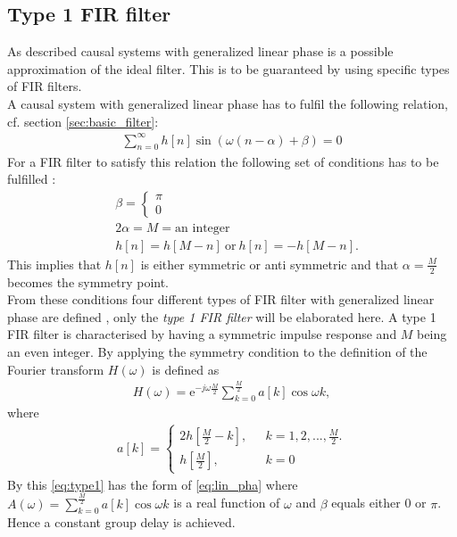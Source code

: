 \subsection{Type 1 FIR filter}
As described causal systems with generalized linear phase is a possible approximation of the ideal filter. This is to be guaranteed by using specific types of FIR filters.\\
A causal system with generalized linear phase has to fulfil the following relation, cf. section \ref{sec:basic_filter}:
\begin{align}
\sum_{n=0}^{\infty}h[n]\sin\left(\omega \left(n-\alpha \right) + \beta \right) = 0
\end{align}
For a FIR filter to satisfy this relation the following set of conditions has to be fulfilled \cite{DTSP, p.342}:
\begin{align} \label{eq:FIR_con}
&\beta = \left\{ \begin{matrix} 
\pi  \\
0 
\end{matrix}\right. \nonumber  \\ 
&2\alpha = M = \text{an integer} \\ 
&h[n]=h[M-n] \ \text{or} \ h[n]=-h[M-n]. \nonumber  
\end{align} 
This implies that $h[n]$ is either symmetric or anti symmetric and that $\alpha = \frac{M}{2}$ becomes the symmetry point. \\
From these conditions four different types of FIR filter with generalized linear phase are defined \cite{DTSP, page 343}, only the \textit{type 1 FIR filter} will be elaborated here.
A type 1 FIR filter is characterised by having a symmetric impulse response and $M$ being an even integer. By applying the symmetry condition to the definition of the Fourier transform $H(\omega)$ is defined as \cite{page 343,DTSP}   
\begin{align}\label{eq:type1}
H(\omega)=\text{e}^{-j\omega \frac{M}{2}} \sum_{k=0}^{\frac{M}{2}} a[k]\cos \omega k,
\end{align}
where 
\begin{align}
a[k]= \left\{ \begin{matrix}
2h\left[ \frac{M}{2} - k \right], \ \ &\ k=1,2,... , \frac{M}{2}.   \\
h[\frac{M}{2}], \ \ &\ k = 0  
\end{matrix}\right.
\end{align}
By this \eqref{eq:type1} has the form of \eqref{eq:lin_pha} where $A(\omega)= \sum_{k=0}^{\frac{M}{2}} a[k]\cos \omega k$ is a real function of $\omega$ and $\beta$ equals either 0 or $\pi$. Hence a constant group delay is achieved.








   
 


 



